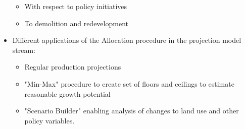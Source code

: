 \begin{itemize}
\begin{itemize}
\item With respect to policy initiatives
\item To demolition and redevelopment 
\end{itemize}
\item Different applications of the Allocation procedure in the projection model stream:
\begin{itemize}
\item Regular production projections
\item "Min-Max" procedure to create set of floors and ceilings to estimate reasonable growth potential
\item "Scenario Builder" enabling analysis of changes to land use and other policy variables. 
\end{itemize}
\end{itemize}
